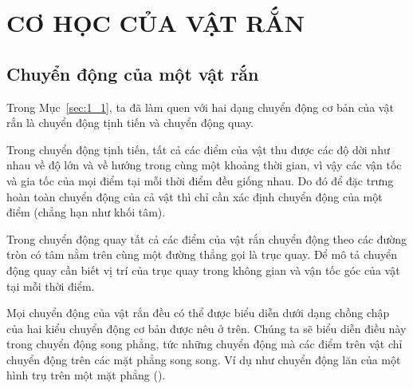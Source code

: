 

\chapter{CƠ HỌC CỦA VẬT RẮN}\label{chap:5}

\section{Chuyển động của một vật rắn}\label{sec:5_1}

Trong Mục~\ref{sec:1_1}, ta đã làm quen với hai dạng chuyển động cơ bản của vật rắn là chuyển động tịnh tiến và chuyển động quay.

Trong chuyển động tịnh tiến, tất cả các điểm của vật thu được các độ dời như nhau về độ lớn và về hướng trong cùng một khoảng thời gian, vì vậy các vận tốc và gia tốc của mọi điểm tại mỗi thời điểm đều giống nhau. Do đó để đặc trưng hoàn toàn chuyển động của cả vật thì chỉ cần xác định chuyển động của một điểm (chẳng hạn như khối tâm).

Trong chuyển động quay tất cả các điểm của vật rắn chuyển động theo các đường tròn có tâm nằm trên cùng một đường thẳng gọi là trục quay. Để mô tả chuyển động quay cần biết vị trí của trục quay trong không gian và vận tốc góc của vật tại mỗi thời điểm.

Mọi chuyển động của vật rắn đều có thể được biểu diễn dưới dạng chồng chập của hai kiểu chuyển động cơ bản được nêu ở trên. Chúng ta sẽ biểu diễn điều này trong chuyển động song phẳng, tức những chuyển động mà các điểm trên vật chỉ chuyển động trên các mặt phẳng song song. Ví dụ như chuyển động lăn của một hình trụ trên một mặt phẳng ().

